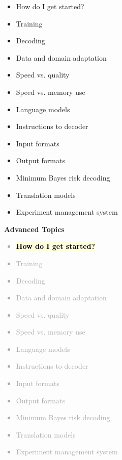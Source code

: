 \documentclass[landscape]{uedslides2C}
\newcommand{\currenttopic}[1]{\colorbox{lightyellow}{\textcolor{black}{\bf #1}}}
\begin{document}

\begin{itemize} \itemsep -1mm

\item How do I get started?
\item Training
\item Decoding
\item Data and domain adaptation

\item Speed vs. quality
\item Speed vs. memory use
\item Language models
\item Instructions to decoder
\item Input formats
\item Output formats
\item Minimum Bayes risk decoding
\item Translation models
\item Experiment management system
\end{itemize}

\slide{}
\vspace{50mm}
\begin{center}
\Huge \bf Advanced Topics
\end{center}


\vspace{-5mm}
\textcolor{darkgrey}{
\begin{itemize} \itemsep -1mm
\item \currenttopic{How do I get started?}
\item Training
\item Decoding
\item Data and domain adaptation
\item Speed vs. quality
\item Speed vs. memory use
\item Language models
\item Instructions to decoder
\item Input formats
\item Output formats
\item Minimum Bayes risk decoding
\item Translation models
\item Experiment management system
\end{itemize}
}
\end{document}
